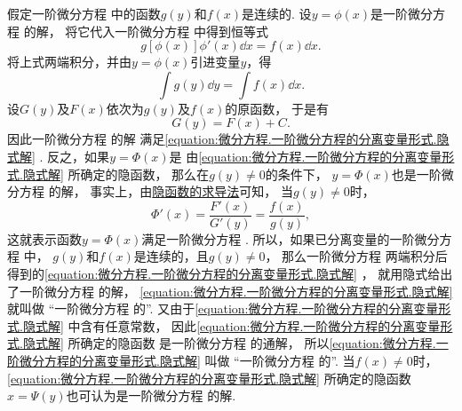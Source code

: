 假定一阶微分方程  中的函数\(g(y)\)和\(f(x)\)是连续的.
设\(y=\phi(x)\)是一阶微分方程  的解，
将它代入一阶微分方程  中得到恒等式\begin{equation*}
	g[\phi(x)] \phi'(x) \dd{x} = f(x) \dd{x}.
\end{equation*}
将上式两端积分，并由\(y=\phi(x)\)引进变量\(y\)，得\begin{equation*}
	\int g(y) \dd{y} = \int f(x) \dd{x}.
\end{equation*}
设\(G(y)\)及\(F(x)\)依次为\(g(y)\)及\(f(x)\)的原函数，
于是有\begin{equation}\label{equation:微分方程.一阶微分方程的分离变量形式.隐式解}
	G(y) = F(x) + C.
\end{equation}
因此一阶微分方程  的解
满足\cref{equation:微分方程.一阶微分方程的分离变量形式.隐式解} .
反之，如果\(y = \Phi(x)\)是
由\cref{equation:微分方程.一阶微分方程的分离变量形式.隐式解} 所确定的隐函数，
那么在\(g(y)\neq0\)的条件下，
\(y=\Phi(x)\)也是一阶微分方程  的解，
事实上，由\hyperref[theorem:多元函数微分法.隐函数存在定理1]{隐函数的求导法}可知，
当\(g(y)\neq0\)时，\begin{equation*}
	\Phi'(x) = \frac{F'(x)}{G'(y)} = \frac{f(x)}{g(y)},
\end{equation*}
这就表示函数\(y = \Phi(x)\)满足一阶微分方程 .
所以，如果已分离变量的一阶微分方程  中，
\(g(y)\)和\(f(x)\)是连续的，且\(g(y)\neq0\)，
那么一阶微分方程 
两端积分后得到的\cref{equation:微分方程.一阶微分方程的分离变量形式.隐式解} ，
就用隐式给出了一阶微分方程  的解，
\cref{equation:微分方程.一阶微分方程的分离变量形式.隐式解} 就叫做
“一阶微分方程  的”.
又由于\cref{equation:微分方程.一阶微分方程的分离变量形式.隐式解} 中含有任意常数，
因此\cref{equation:微分方程.一阶微分方程的分离变量形式.隐式解} 所确定的隐函数
是一阶微分方程  的通解，
所以\cref{equation:微分方程.一阶微分方程的分离变量形式.隐式解} 叫做
“一阶微分方程  的”.
当\(f(x)\neq0\)时，\cref{equation:微分方程.一阶微分方程的分离变量形式.隐式解}
所确定的隐函数\(x=\Psi(y)\)也可认为是一阶微分方程  的解.

